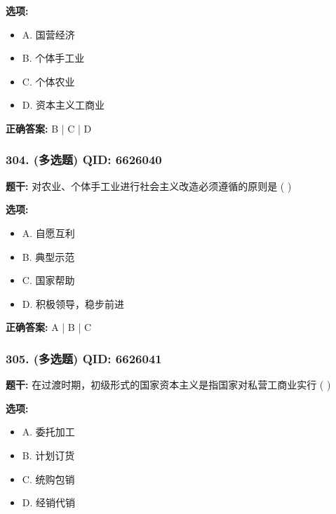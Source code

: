\documentclass[12pt,UTF8]{ctexart}
\begin{document}
\textbf{选项:}
\begin{itemize}[leftmargin=*]

  \item A. 国营经济

  \item B. 个体手工业

  \item C. 个体农业

  \item D. 资本主义工商业

\end{itemize}

\textbf{正确答案:}
B | C | D

\vspace{0.3em}\hrulefill\vspace{0.7em}

\subsubsection*{304. (多选题) \small QID: 6626040}

\textbf{题干:}
对农业、个体手工业进行社会主义改造必须遵循的原则是  ( )

\textbf{选项:}
\begin{itemize}[leftmargin=*]

  \item A. 自愿互利

  \item B. 典型示范

  \item C. 国家帮助

  \item D. 积极领导，稳步前进

\end{itemize}

\textbf{正确答案:}
A | B | C

\vspace{0.3em}\hrulefill\vspace{0.7em}

\subsubsection*{305. (多选题) \small QID: 6626041}

\textbf{题干:}
在过渡时期，初级形式的国家资本主义是指国家对私营工商业实行  ( )

\textbf{选项:}
\begin{itemize}[leftmargin=*]

  \item A. 委托加工

  \item B. 计划订货

  \item C. 统购包销

  \item D. 经销代销

\end{itemize}
\end{document}
